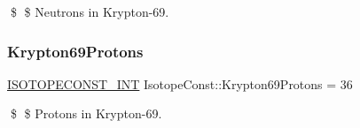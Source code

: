 \$ \$ Neutrons in Krypton-\/69. \mbox{\label{group___isotope_const-_krypton-_kr69_gabe646401dc215e4be6ecb44de05e8d0e}} 
\subsubsection{\texorpdfstring{Krypton69\+Protons}{Krypton69Protons}}
{\footnotesize\ttfamily \mbox{\hyperlink{group___isotope_const-_macros_ga5f18360b3e99483a35c32d789e62621c}{I\+S\+O\+T\+O\+P\+E\+C\+O\+N\+S\+T\+\_\+\+I\+NT}} Isotope\+Const\+::\+Krypton69\+Protons = 36}

\$ \$ Protons in Krypton-\/69. 